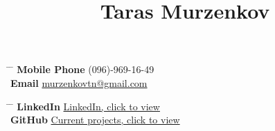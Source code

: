 \documentclass[10pt]{article} %
\begin{document}


\title{Taras Murzenkov } %


\parbox{0.2\textwidth}{ %
\begin{tabbing} %
\hspace{3cm} \= \hspace{4cm} \= \kill %
{\bf Mobile Phone} \> (096)-969-16-49\\ %
{\bf Email} \> \href{mailto:murzenkovtn@gmail.com}{murzenkovtn@gmail.com} \\ %

\end{tabbing}}
\hfill %
\parbox{0.5\textwidth}{ %
\begin{tabbing} %
\hspace{3cm} \= \hspace{4cm} \= \kill %
{\bf LinkedIn} \> \href{https://www.linkedin.com/in/tarasmurzenkov}{LinkedIn, click to view} \\ %
{\bf GitHub} \> \href{https://github.com/tarasmurzenkovv/}{Current projects, click to view}\\ %

\end{tabbing}}

\end{document}
